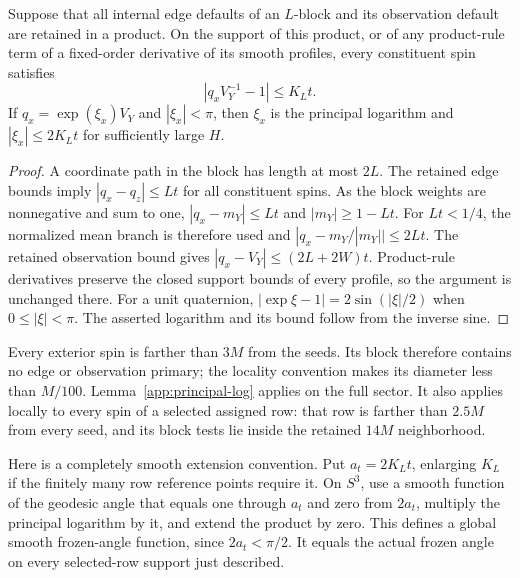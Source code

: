 \begin{lemma}
\label{app:principal-log}
Suppose that all internal edge defaults of an $L$-block and its
observation default are retained in a product.  On the support of this
product, or of any product-rule term of a fixed-order derivative of its
smooth profiles, every constituent spin satisfies
\[
 |q_xV_Y^{-1}-1|\le K_Lt.
\]
If $q_x=\exp(\xi_x)V_Y$ and $|\xi_x|<\pi$, then
$\xi_x$ is the principal logarithm and
$|\xi_x|\le 2K_Lt$ for sufficiently large $H$.
\end{lemma}
\begin{proof}
A coordinate path in the block has length at most $2L$.  The retained
edge bounds imply $|q_x-q_z|\le Lt$ for all constituent spins.  As the
block weights are nonnegative and sum to one,
$|q_x-m_Y|\le Lt$ and $|m_Y|\ge1-Lt$.  For $Lt<1/4$, the normalized
mean branch is therefore used and
$|q_x-m_Y/|m_Y||\le2Lt$.  The retained observation bound gives
$|q_x-V_Y|\le(2L+2W)t$.  Product-rule derivatives preserve the closed
support bounds of every profile, so the argument is unchanged there.
For a unit quaternion,
$|\exp\xi-1|=2\sin(|\xi|/2)$ when $0\le|\xi|<\pi$.
The asserted logarithm and its bound follow from the inverse sine.
\end{proof}

Every exterior spin is farther than $3M$ from the seeds.  Its block
therefore contains no edge or observation primary; the locality
convention makes its diameter less than $M/100$.  Lemma~\ref{app:principal-log}
applies on the full sector.  It also applies locally to every spin of a
selected assigned row: that row is farther than $2.5M$ from every seed,
and its block tests lie inside the retained $14M$ neighborhood.

Here is a completely smooth extension convention.  Put $a_t=2K_Lt$,
enlarging $K_L$ if the finitely many row reference points require it.
On $S^3$, use a smooth function of the geodesic angle that equals one
through $a_t$ and zero from $2a_t$, multiply the principal logarithm
by it, and extend the product by zero.  This defines a global smooth
frozen-angle function, since $2a_t<\pi/2$.  It equals the actual frozen
angle on every selected-row support just described.

